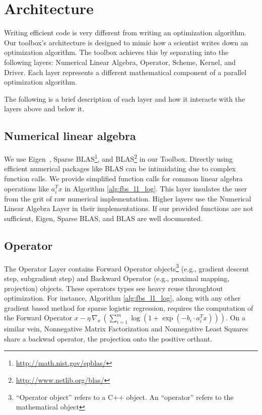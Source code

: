 \section{Architecture}


Writing efficient code is very different from writing an optimization algorithm.
Our toolbox's architecture is designed to mimic how a scientist writes down an optimization algorithm.
The toolbox achieves this by separating into the following layers: Numerical Linear Algebra, Operator, Scheme, Kernel, and Driver.
Each layer represents a different mathematical component of a parallel optimization algorithm.


The following is a brief description of each layer and how it interacts with the layers above and below it. 

\subsection{Numerical linear algebra}

We use Eigen~\citep{eigenweb}, Sparse BLAS\footnote{\url{http://math.nist.gov/spblas/}}, and BLAS\footnote{\url{http://www.netlib.org/blas/}} in our Toolbox.
Directly using efficient numerical packages like BLAS can be intimidating due to complex function calls. We provide simplified function calls for common linear algebra operations like $a_i^T x$ in Algorithm \ref{alg:fbs_l1_log}. This layer insulates the user from the grit of raw numerical implementation. Higher layers use the Numerical Linear Algebra Layer in their implementations.
If our provided functions are not sufficient, Eigen, Sparse BLAS, and BLAS are well documented. 

\subsection{Operator}

The Operator Layer contains Forward Operator objects\footnote{``Operator object'' refers to a C++ object. An ``operator'' refers to the mathematical object } (e.g., gradient descent step, subgradient step) and Backward Operator (e.g., proximal mapping, projection) objects. These operators types see heavy reuse throughtout optimization.
For instance, Algorithm \ref{alg:fbs_l1_log}, along with any other gradient based method for sparse logistic regression, requires the computation of the Forward Operator $x - \eta \, \nabla_x \,(\sum_{i = 1}^m \log (1 + \exp(-b_i \cdot a_i^T x)))$. On a similar vein, Nonnegative Matrix Factorization and Nonnegative Least Squares share a backwad operator, the projection onto the positive orthant.


